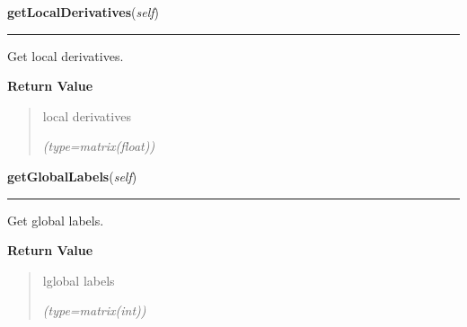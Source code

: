     \label{gblfit:GblPoint:getLocalDerivatives}

    \vspace{0.5ex}

\hspace{.8\funcindent}\begin{boxedminipage}{\funcwidth}

    \raggedright \textbf{getLocalDerivatives}(\textit{self})

    \vspace{-1.5ex}

    \rule{\textwidth}{0.5\fboxrule}
\setlength{\parskip}{2ex}
    Get local derivatives.

\setlength{\parskip}{1ex}
      \textbf{Return Value}
    \vspace{-1ex}

      \begin{quote}
      local derivatives

      {\it (type=matrix(float))}

      \end{quote}

    \end{boxedminipage}

    \label{gblfit:GblPoint:getGlobalLabels}

    \vspace{0.5ex}

\hspace{.8\funcindent}\begin{boxedminipage}{\funcwidth}

    \raggedright \textbf{getGlobalLabels}(\textit{self})

    \vspace{-1.5ex}

    \rule{\textwidth}{0.5\fboxrule}
\setlength{\parskip}{2ex}
    Get global labels.

\setlength{\parskip}{1ex}
      \textbf{Return Value}
    \vspace{-1ex}

      \begin{quote}
      lglobal labels

      {\it (type=matrix(int))}

      \end{quote}

    \end{boxedminipage}

